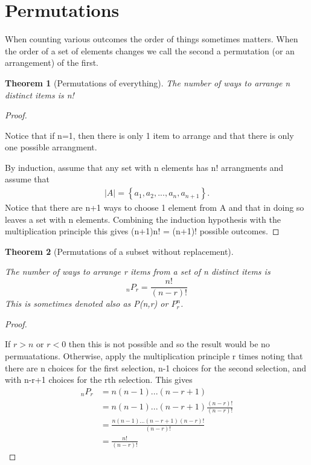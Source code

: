 \documentclass[10pt,]{book}
\theoremstyle{plain}
\newtheorem{theorem}{Theorem}[section]
\theoremstyle{definition}
\theoremstyle{definition}
\theoremstyle{definition}
\numberwithin{equation}{section}
\newcommand{\lt}{ < }
\newcommand{\gt}{ > }
\begin{document}
\section[{Permutations}]{Permutations}\label{section-16}
When counting various outcomes the order of things sometimes matters. When the order of a set of elements changes we call the second a permutation (or an arrangement) of the first.%
\begin{theorem}[{Permutations of everything}]\label{theorem-5}
The number of ways to arrange n distinct items is n!\end{theorem}
\begin{proof}\hypertarget{proof-5}{}
Notice that if n=1, then there is only 1 item to arrange and 
			that there is only one possible arrangment.%
\par

			By induction, assume that any set with n elements has n! arrangments 
			and assume that 
			\begin{gather*}
|A| = \left \{ a_1, a_2, ... , a_n, a_{n+1} \right \}.
\end{gather*}
			Notice that there are n+1 ways to choose 1 element from A and that in doing so leaves a set with n elements. Combining the induction hypothesis with the multiplication principle this gives (n+1)n! = (n+1)! possible outcomes.
\end{proof}
\begin{theorem}[{Permutations of a subset without replacement}]\label{theorem-6}
 
			The number of ways to arrange r items from a set of n distinct items 
			is 
			\begin{equation*} _nP_r = \frac{n!}{(n-r)!} \end{equation*}
			This is sometimes denoted also as P(n,r) or \(P_r^n\).
\end{theorem}
\begin{proof}\hypertarget{proof-6}{}

			If \(r \gt n\) or \(r \lt 0 \) then this is not possible and so the result would be no permuatations. Otherwise, apply the multiplication principle r times noting that there are 
			n choices for the first selection, n-1 choices for the second
			selection, and with n-r+1 choices for the rth selection. This gives
			\begin{align*}
_nP_r & = n(n-1) ... (n-r+1)\\
& = n(n-1) ... (n-r+1)\frac{(n-r)!}{(n-r)!}\\
& = \frac{n(n-1) ... (n-r+1)(n-r)!}{(n-r)!}\\
& = \frac{n!}{(n-r)!}
\end{align*}
\end{proof}
\end{document}
